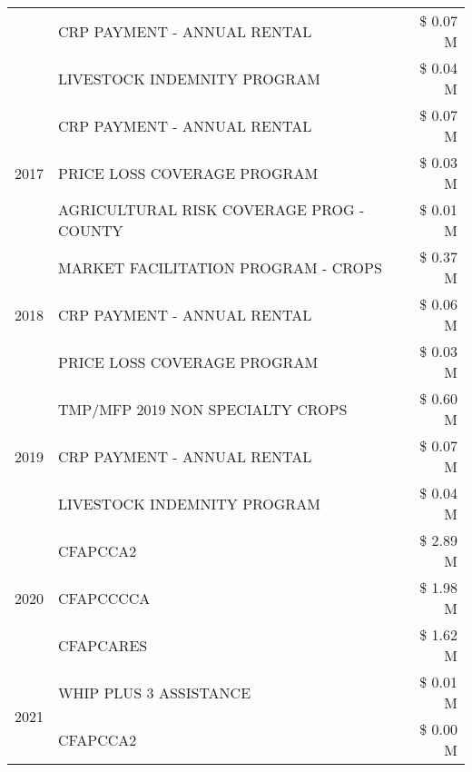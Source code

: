 \begin{tabular}{llr}
 & CRP PAYMENT - ANNUAL RENTAL & \$ 0.07 M \\
 & LIVESTOCK INDEMNITY PROGRAM & \$ 0.04 M \\
\cline{1-3}
\multirow[t]{3}{*}{2017} & CRP PAYMENT - ANNUAL RENTAL & \$ 0.07 M \\
 & PRICE LOSS COVERAGE PROGRAM & \$ 0.03 M \\
 & AGRICULTURAL RISK COVERAGE PROG - COUNTY & \$ 0.01 M \\
\cline{1-3}
\multirow[t]{3}{*}{2018} & MARKET FACILITATION PROGRAM - CROPS & \$ 0.37 M \\
 & CRP PAYMENT - ANNUAL RENTAL & \$ 0.06 M \\
 & PRICE LOSS COVERAGE PROGRAM & \$ 0.03 M \\
\cline{1-3}
\multirow[t]{3}{*}{2019} & TMP/MFP 2019 NON SPECIALTY CROPS & \$ 0.60 M \\
 & CRP PAYMENT - ANNUAL RENTAL & \$ 0.07 M \\
 & LIVESTOCK INDEMNITY PROGRAM & \$ 0.04 M \\
\cline{1-3}
\multirow[t]{3}{*}{2020} & CFAPCCA2 & \$ 2.89 M \\
 & CFAPCCCCA & \$ 1.98 M \\
 & CFAPCARES & \$ 1.62 M \\
\cline{1-3}
\multirow[t]{2}{*}{2021} & WHIP PLUS 3 ASSISTANCE & \$ 0.01 M \\
 & CFAPCCA2 & \$ 0.00 M \\
\cline{1-3}
\bottomrule
\end{tabular}
